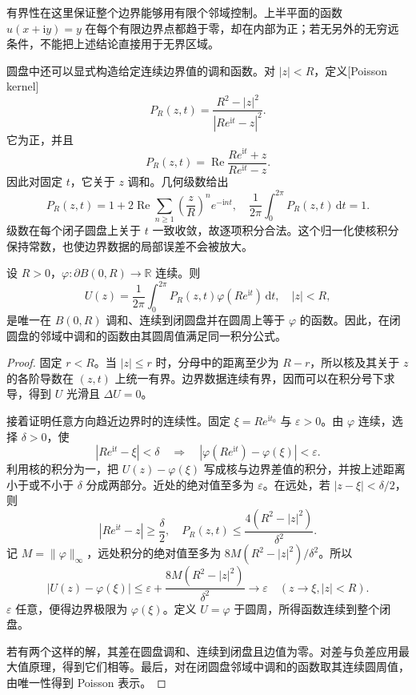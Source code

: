 有界性在这里保证整个边界能够用有限个邻域控制。上半平面的函数 \(u(x+\mathrm i y)=y\) 在每个有限边界点都趋于零，却在内部为正；若无另外的无穷远条件，不能把上述结论直接用于无界区域。

\ProseParagraphBreak
圆盘中还可以显式构造给定连续边界值的调和函数。对 \(|z|<R\)，定义[Poisson kernel]
\[
 P_R(z,t)=\frac{R^2-|z|^2}{|Re^{\mathrm i t}-z|^2}.
\]
它为正，并且
\[
 P_R(z,t)=\operatorname{Re}\frac{Re^{\mathrm i t}+z}{Re^{\mathrm i t}-z}.
\]
因此对固定 \(t\)，它关于 \(z\) 调和。几何级数给出
\[
 P_R(z,t)=1+2\operatorname{Re}\sum_{n\ge1}
 \left(\frac zR\right)^n e^{-\mathrm i nt},
 \quad
 \frac{1}{2\pi}\int_0^{2\pi}P_R(z,t)\,\mathrm dt=1.
\]
级数在每个闭子圆盘上关于 \(t\) 一致收敛，故逐项积分合法。这个归一化使核积分保持常数，也使边界数据的局部误差不会被放大。

\begin{theorem}\label{b3:thm:15-poisson-continuous}
设 \(R>0\)，\(\varphi:\partial B(0,R)\to\mathbb R\) 连续。则
\[
 U(z)=\frac{1}{2\pi}\int_0^{2\pi}
 P_R(z,t)\varphi(Re^{\mathrm i t})\,\mathrm dt,
 \quad |z|<R,
\]
是唯一在 \(B(0,R)\) 调和、连续到闭圆盘并在圆周上等于 \(\varphi\) 的函数。因此，在闭圆盘的邻域中调和的函数由其圆周值满足同一积分公式。
\end{theorem}
\begin{proof}
固定 \(r<R\)。当 \(|z|\le r\) 时，分母中的距离至少为 \(R-r\)，所以核及其关于 \(z\) 的各阶导数在 \((z,t)\) 上统一有界。边界数据连续有界，因而可以在积分号下求导，得到 \(U\) 光滑且 \(\Delta U=0\)。

接着证明任意方向趋近边界时的连续性。固定 \(\xi=Re^{\mathrm i t_0}\) 与 \(\varepsilon>0\)。由 \(\varphi\) 连续，选择 \(\delta>0\)，使
\[
 |Re^{\mathrm i t}-\xi|<\delta
 \quad\Longrightarrow\quad
 |\varphi(Re^{\mathrm i t})-\varphi(\xi)|<\varepsilon.
\]
利用核的积分为一，把 \(U(z)-\varphi(\xi)\) 写成核与边界差值的积分，并按上述距离小于或不小于 \(\delta\) 分成两部分。近处的绝对值至多为 \(\varepsilon\)。在远处，若 \(|z-\xi|<\delta/2\)，则
\[
 |Re^{\mathrm i t}-z|\ge\frac\delta2,
 \quad
 P_R(z,t)\le\frac{4(R^2-|z|^2)}{\delta^2}.
\]
记 \(M=\|\varphi\|_\infty\)，远处积分的绝对值至多为 \(8M(R^2-|z|^2)/\delta^2\)。所以
\[
 |U(z)-\varphi(\xi)|
 \le\varepsilon+\frac{8M(R^2-|z|^2)}{\delta^2}
 \longrightarrow\varepsilon
 \quad(z\to\xi, |z|<R).
\]
\(\varepsilon\) 任意，便得边界极限为 \(\varphi(\xi)\)。定义 \(U=\varphi\) 于圆周，所得函数连续到整个闭盘。

若有两个这样的解，其差在圆盘调和、连续到闭盘且边值为零。对差与负差应用最大值原理，得到它们相等。最后，对在闭圆盘邻域中调和的函数取其连续圆周值，由唯一性得到 Poisson 表示。
\end{proof}

